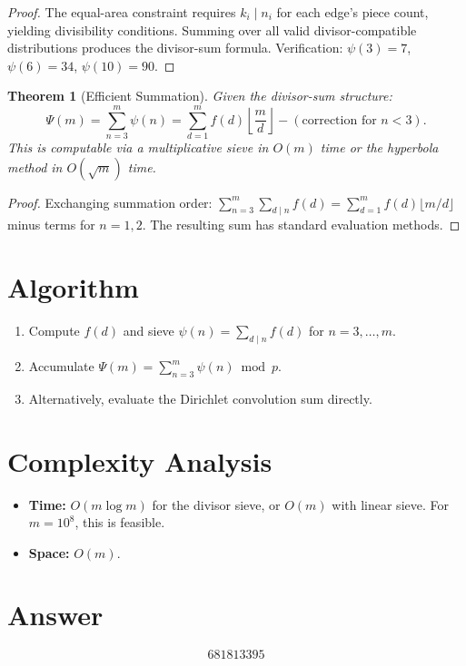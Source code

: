 \documentclass[11pt]{article}
\newtheorem{theorem}{Theorem}
\theoremstyle{definition}
\begin{document}
\begin{proof}
The equal-area constraint requires $k_i \mid n_i$ for each edge's piece count, yielding divisibility conditions. Summing over all valid divisor-compatible distributions produces the divisor-sum formula. Verification: $\psi(3)=7$, $\psi(6)=34$, $\psi(10)=90$.
\end{proof}

\begin{theorem}[Efficient Summation]
Given the divisor-sum structure:
\[
\Psi(m) = \sum_{n=3}^{m}\psi(n) = \sum_{d=1}^{m} f(d)\left\lfloor\frac{m}{d}\right\rfloor - (\text{correction for } n < 3).
\]
This is computable via a multiplicative sieve in $O(m)$ time or the hyperbola method in $O(\sqrt{m})$ time.
\end{theorem}

\begin{proof}
Exchanging summation order: $\sum_{n=3}^{m}\sum_{d \mid n} f(d) = \sum_{d=1}^{m} f(d)\lfloor m/d\rfloor$ minus terms for $n = 1,2$. The resulting sum has standard evaluation methods.
\end{proof}

\section{Algorithm}

\begin{enumerate}
\item Compute $f(d)$ and sieve $\psi(n) = \sum_{d \mid n} f(d)$ for $n = 3,\ldots,m$.
\item Accumulate $\Psi(m) = \sum_{n=3}^{m}\psi(n) \bmod p$.
\item Alternatively, evaluate the Dirichlet convolution sum directly.
\end{enumerate}

\section{Complexity Analysis}

\begin{itemize}
\item \textbf{Time:} $O(m\log m)$ for the divisor sieve, or $O(m)$ with linear sieve. For $m = 10^8$, this is feasible.
\item \textbf{Space:} $O(m)$.
\end{itemize}

\section{Answer}

\[
\boxed{681813395}
\]
\end{document}
